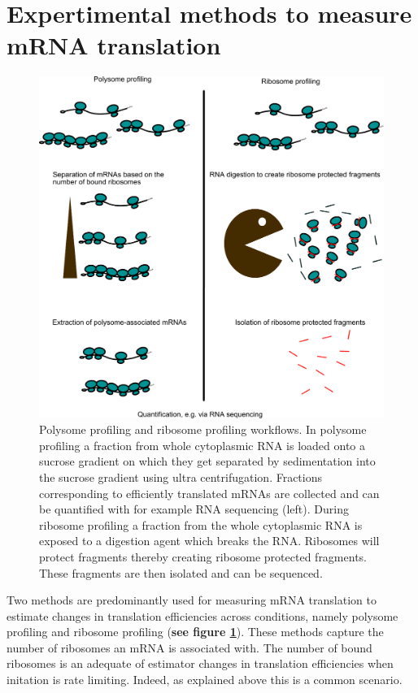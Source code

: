 \documentclass[12pt,openany]{book}
\begin{document}
\clearpage
\section{Expertimental methods to measure mRNA translation} \label{exptMethod}

\begin{figure}
    \includegraphics{./figures/polyRibo.pdf}
  \caption{Polysome profiling and ribosome profiling workflows. In polysome profiling a fraction from whole cytoplasmic RNA is loaded onto a sucrose gradient on which they get separated by sedimentation into the sucrose gradient using ultra centrifugation. Fractions corresponding to efficiently translated mRNAs are collected and can be quantified with for example RNA sequencing (left). During ribosome profiling a fraction from the whole cytoplasmic RNA is exposed to a digestion agent which breaks the RNA. Ribosomes will protect fragments thereby creating ribosome protected fragments. These fragments are then isolated and can be sequenced.  \label{fig:polyRibo}}
\end{figure}

Two methods are predominantly used for measuring mRNA translation to
estimate changes in translation efficiencies across conditions, namely
polysome profiling and ribosome profiling (\textbf{see figure
\ref{fig:polyRibo}}). These methods capture the number of ribosomes an
mRNA is associated with. The number of bound ribosomes is an adequate of
estimator changes in translation efficiencies when initation is rate
limiting. Indeed, as explained above this is a common scenario.
\end{document}
